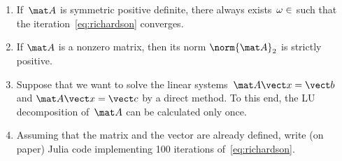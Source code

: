 \documentclass{article}
\begin{document}
\begin{enumerate}
    \item
        If~$\mat A$ is symmetric positive definite,
        there always exists~$\omega \in \real$ such that
        the iteration~\eqref{eq:richardson} converges.

    \item
        If $\mat A$ is a nonzero matrix,
        then its norm $\norm{\mat A}_2$ is strictly positive.

    \item
        Suppose that we want to solve the linear systems~$\mat A \vect x = \vect b$ and $\mat A \vect x = \vect c$ by a direct method.
        To this end, the LU decomposition of~$\mat A$ can be calculated only once.

    \item
        Assuming that the matrix  and the vector  are already defined,
        write (on paper) Julia code implementing 100 iterations of~\eqref{eq:richardson}.
\end{enumerate}
\end{document}

